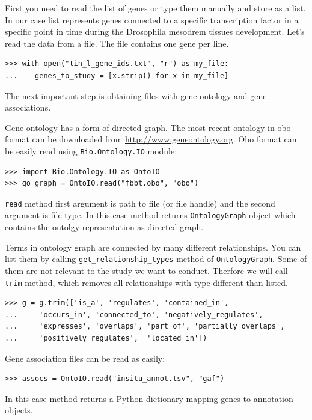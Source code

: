 \documentclass{report}
\begin{document}
First you need to read the list of genes or type them manually and store as
a list. In our case list represents genes connected to a specific transcription
factor in a specific point in time during the Drosophila mesodrem tissues development.
Let's read the data from a file. The file contains one gene per line.

\begin{verbatim}
>>> with open("tin_l_gene_ids.txt", "r") as my_file:
...    genes_to_study = [x.strip() for x in my_file]

\end{verbatim}

The next important step is obtaining files with gene ontology and gene
associations.

Gene ontology has a form of directed graph.
The most recent ontology in obo format can be downloaded from
\url{http://www.geneontology.org}. Obo format can be easily read using
\verb|Bio.Ontology.IO| module:

\begin{verbatim}
>>> import Bio.Ontology.IO as OntoIO
>>> go_graph = OntoIO.read("fbbt.obo", "obo")
\end{verbatim}

\verb|read| method first argument is path to file (or file handle) and the
second argument is file type. In this case method returns \verb|OntologyGraph|
object which contains the ontolgy representation as directed graph.

Terms in ontology graph are connected by many different relationships. You can
list them by calling \verb|get_relationship_types| method of \verb|OntologyGraph|.
Some of them are not relevant to the study we want to conduct. Therfore we will
call \verb|trim| method, which removes all relationships with type different
than listed.

\begin{verbatim}
>>> g = g.trim(['is_a', 'regulates', 'contained_in',
...     'occurs_in', 'connected_to', 'negatively_regulates',
...     'expresses', 'overlaps', 'part_of', 'partially_overlaps',
...     'positively_regulates',  'located_in'])
\end{verbatim}

Gene association files can be read as easily:

\begin{verbatim}
>>> assocs = OntoIO.read("insitu_annot.tsv", "gaf")
\end{verbatim}


In this case method returns a Python dictionary mapping genes to
annotation objects.
\end{document}
